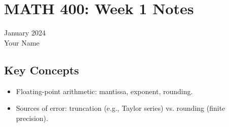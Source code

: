 \section*{MATH 400: Week 1 Notes}
\begin{center}
  January 2024 \\
  Your Name
\end{center}

\subsection*{Key Concepts}
\begin{itemize}
  \item Floating-point arithmetic: mantissa, exponent, rounding.
  \item Sources of error: truncation (e.g., Taylor series) vs. rounding (finite precision).
\end{itemize}
